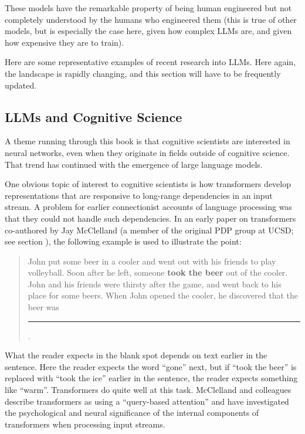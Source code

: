 These models have the remarkable property of being human engineered but not completely understood by the humans who engineered them (this is true of other models, but is especially the case here, given how complex LLMs are, and given how expensive they are to train). 

Here are some representative examples of recent research into LLMs. Here again, the landscape is rapidly changing, and this section will have to be frequently updated.

\subsection{LLMs and Cognitive Science}\label{llm_cogsci}

A theme running through this book is that cognitive scientists are interested in neural networks, even when they originate in fields outside of cognitive science. That trend has continued with the emergence of large language models.

One obvious topic of interest to cognitive scientists is how transformers develop representations that are responsive to long-range dependencies in an input stream. A problem for earlier connectionist accounts of language processing was that they could not handle such dependencies. In an early paper on transformers co-authored by Jay McClelland  \cite{mcclelland2020placing} (a member of the original PDP group at UCSD; see section ), the following example is used to illustrate the point:
\begin{quote}
John put some beer in a cooler and went out with his friends to play volleyball. Soon after he left, someone \textbf{took the beer} out of the cooler. John and his friends were thirsty after the game, and went back to his place for some beers. When John opened the cooler, he discovered that the beer was \rule{1cm}{0.15mm}.
\end{quote}
What the reader expects in the blank spot depends on text earlier in the sentence. Here the reader expects the word ``gone'' next, but if ``took the beer'' is replaced with ``took the ice'' earlier in the sentence, the reader expects something like ``warm''. Transformers do quite well at this task. McClelland and colleagues describe transformers as using a ``query-based attention''  and have investigated the psychological and neural significance of the internal components of transformers when processing input streams. 

